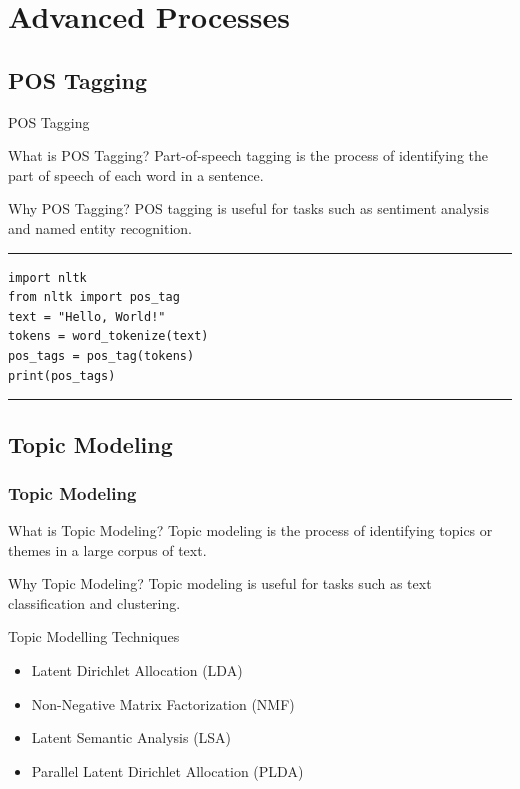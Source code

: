 \documentclass[aspectratio=169, hideothersubsections]{beamer}
\begin{document}
\section{Advanced Processes}

\subsection{POS Tagging}

\begin{frame}[fragile]{POS Tagging}
  \begin{block}{What is POS Tagging?}
    Part-of-speech tagging is the process of identifying the part of speech of each word in a sentence.
  \end{block}
  \begin{block}{Why POS Tagging?}
    POS tagging is useful for tasks such as sentiment analysis and named entity recognition.
  \end{block}
\rule{\textwidth}{1pt}
\scriptsize
\begin{verbatim}
import nltk
from nltk import pos_tag
text = "Hello, World!"
tokens = word_tokenize(text)
pos_tags = pos_tag(tokens)
print(pos_tags)
\end{verbatim}
\rule{\textwidth}{1pt}
\end{frame}

\subsection{Topic Modeling}

\begin{frame}
  \frametitle{Topic Modeling}
  \begin{block}{What is Topic Modeling?}
    Topic modeling is the process of identifying topics or themes in a large corpus of text.
  \end{block}
  \begin{block}{Why Topic Modeling?}
    Topic modeling is useful for tasks such as text classification and clustering.
  \end{block}
  \begin{block}{Topic Modelling Techniques}
      \begin{itemize}
        \item Latent Dirichlet Allocation (LDA)
        \item Non-Negative Matrix Factorization (NMF)
        \item Latent Semantic Analysis (LSA)
        \item Parallel Latent Dirichlet Allocation (PLDA)
      \end{itemize}
  \end{block}
\end{frame}
\end{document}
